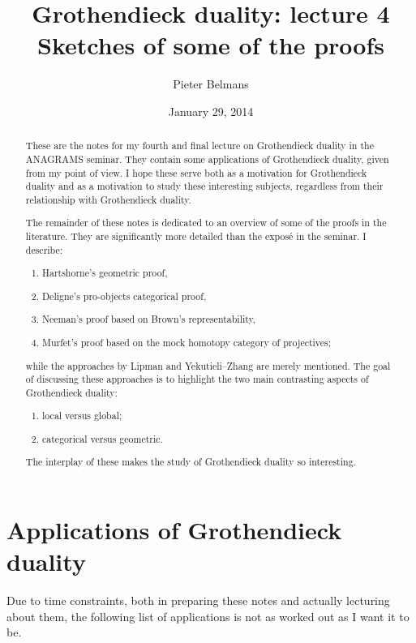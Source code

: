 \documentclass[10pt,a4paper]{article}
\title{Grothendieck duality: lecture 4 \\[.2em] \Large Sketches of some of the proofs}
\author{Pieter Belmans}
\date{January 29, 2014}
\begin{document}
\maketitle

\begin{abstract}
  These are the notes for my fourth and final lecture on Grothendieck duality in the ANAGRAMS seminar. They contain some applications of Grothendieck duality, given from my point of view. I hope these serve both as a motivation for Grothendieck duality and as a motivation to study these interesting subjects, regardless from their relationship with Grothendieck duality.

  The remainder of these notes is dedicated to an overview of some of the proofs in the literature. They are significantly more detailed than the expos\'e in the seminar. I describe:
  \begin{enumerate}
    \item Hartshorne's geometric proof,
    \item Deligne's pro-objects categorical proof,
    \item Neeman's proof based on Brown's representability,
    \item Murfet's proof based on the mock homotopy category of projectives;
  \end{enumerate}
  while the approaches by Lipman and Yekutieli--Zhang are merely mentioned. The goal of discussing these approaches is to highlight the two main contrasting aspects of Grothendieck duality:
  \begin{enumerate}
    \item local versus global;
    \item categorical versus geometric.
  \end{enumerate}
  The interplay of these makes the study of Grothendieck duality so interesting.
\end{abstract}

\tableofcontents

\clearpage

\section{Applications of Grothendieck duality}
\label{section:applications-grothendieck-duality}
Due to time constraints, both in preparing these notes and actually lecturing about them, the following list of applications is not as worked out as I want it to be.
\end{document}
